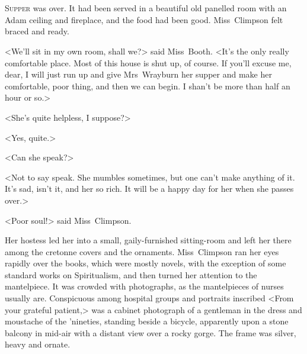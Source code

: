 \chapter[Chapter \thechapter]{}
\lettrine{S}{upper} was over. It had been served in a beautiful old panelled room with an Adam ceiling and fireplace, and the food had been good. Miss~Climpson felt braced and ready.

\zz
<We'll sit in my own room, shall we?> said Miss~Booth. <It's the only really comfortable place. Most of this house is shut up, of course. If you'll excuse me, dear, I will just run up and give Mrs~Wrayburn her supper and make her comfortable, poor thing, and then we can begin. I shan't be more than half an hour or so.>

<She's quite helpless, I suppose?>

<Yes, quite.>

<Can she speak?>

<Not to say speak. She mumbles sometimes, but one can't make anything of it. It's sad, isn't it, and her so rich. It will be a happy day for her when she passes over.>

<Poor soul!> said Miss~Climpson.

Her hostess led her into a small, gaily-furnished sitting-room and left her there among the cretonne covers and the ornaments. Miss~Climpson ran her eyes rapidly over the books, which were mostly novels, with the exception of some standard works on Spiritualism, and then turned her attention to the mantelpiece. It was crowded with photographs, as the mantelpieces of nurses usually are. Conspicuous among hospital groups and portraits inscribed <From your grateful patient,> was a cabinet photograph of a gentleman in the dress and moustache of the 'nineties, standing beside a bicycle, apparently upon a stone balcony in mid-air with a distant view over a rocky gorge. The frame was silver, heavy and ornate.

